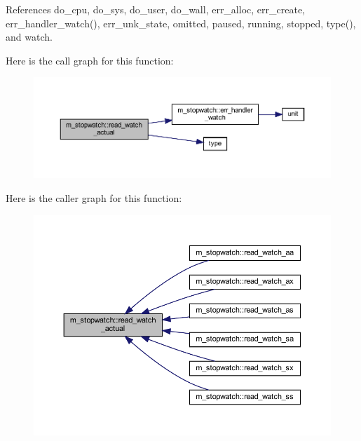 References do\+\_\+cpu, do\+\_\+sys, do\+\_\+user, do\+\_\+wall, err\+\_\+alloc, err\+\_\+create, err\+\_\+handler\+\_\+watch(), err\+\_\+unk\+\_\+state, omitted, paused, running, stopped, type(), and watch.

Here is the call graph for this function\+:
\nopagebreak
\begin{figure}[H]
\begin{center}
\leavevmode
\includegraphics[width=350pt]{namespacem__stopwatch_a5cac73ed1e81ddd74796a45b37b31ec4_cgraph}
\end{center}
\end{figure}
Here is the caller graph for this function\+:
\nopagebreak
\begin{figure}[H]
\begin{center}
\leavevmode
\includegraphics[width=350pt]{namespacem__stopwatch_a5cac73ed1e81ddd74796a45b37b31ec4_icgraph}
\end{center}
\end{figure}
\mbox{\label{namespacem__stopwatch_a281bc81f897b1e58da49f7fbfa9f304e}} 
